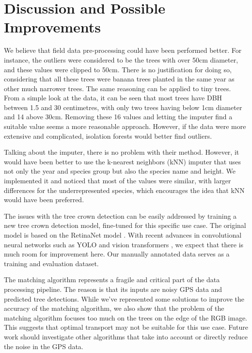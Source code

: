 \documentclass[10pt,twocolumn,letterpaper]{article}
\begin{document}
\section{Discussion and Possible Improvements}
\label{sec:discussion}
We believe that field data pre-processing could have been performed better. For instance, the outliers were considered to be the trees with over 50cm diameter, and these values were clipped to 50cm. There is no justification for doing so, considering that all these trees were banana trees planted in the same year as other much narrower trees. The same reasoning can be applied to tiny trees. From a simple look at the data, it can be seen that most trees have DBH between 1.5 and 30 centimetres, with only two trees having below 1cm diameter and 14 above 30cm. Removing these 16 values and letting the imputer find a suitable value seems a more reasonable approach. However, if the data were more extensive and complicated, isolation forests \cite{liu2008isolation} would better find outliers.

Talking about the imputer, there is no problem with their method. However, it would have been better to use the k-nearest neighbors (kNN) \cite{peterson2009k} imputer that uses not only the year and species group but also the species name and height. We implemented it and noticed that most of the values were similar, with larger differences for the underrepresented species, which encourages the idea that kNN would have been preferred.

The issues with the tree crown detection can be easily addressed by training a new tree crown detection model, fine-tuned for this specific use case.
The original model is based on the RetinaNet model \cite{retinanet}.
With recent advances in convolutional neural networks such as YOLO \cite{yolo} and vision transformers \cite{detr}, we expect that there is much room for improvement here.
Our manually annotated data serves as a training and evaluation dataset.

The matching algorithm represents a fragile and critical part of the data processing pipeline.
The reason is that its inputs are noisy GPS data and predicted tree detections.
While we've represented some solutions to improve the accuracy of the matching algorithm, we also show that the problem of the matching algorithm focuses too much on the trees on the edge of the RGB image.
This suggests that optimal transport may not be suitable for this use case.
Future work should investigate other algorithms that take into account or directly reduce the noise in the GPS data.
\end{document}
